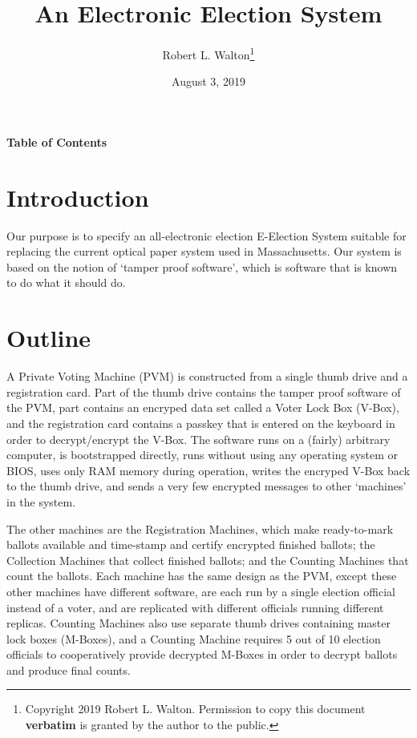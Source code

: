 \documentclass[12pt]{article}
\makeatletter
\renewcommand\tableofcontents{%
    \begin{list}{}%
	     {\setlength{\itemsep}{0in}%
	      \setlength{\topsep}{0in}%
	      \setlength{\parsep}{1ex}%
	      \setlength{\labelwidth}{0in}%
	      \setlength{\baselineskip}{1.5ex}%
	      \setlength{\leftmargin}{0.8in}%
	      \setlength{\rightmargin}{0.8in}}%
    \item\@starttoc{toc}%
    \end{list}}
\makeatother
\begin{document}
        
\title{An Electronic Election System}

\author{Robert L. Walton\thanks{Copyright 2019 Robert L. Walton.
Permission to copy this document {\bf verbatim} is granted by the author
to the public.}}

\date{August 3, 2019}

\maketitle

\begin{center}
\large \bf Table of Contents
\end{center}

\bigskip

\tableofcontents 

\newpage

\section{Introduction}

Our purpose is to specify an all-electronic election E-Election System
suitable for replacing the current optical paper system
used in Massachusetts.  Our system is based on the notion
of `tamper proof software', which is software that is
known to do what it should do.

\section{Outline}

A Private Voting Machine
(PVM) is constructed from a single thumb drive and a
registration card.  Part of the thumb drive contains the
tamper proof software of the PVM, part contains an encryped
data set called a Voter Lock Box (V-Box), and the registration
card contains a passkey that is entered on the keyboard in
order to decrypt/encrypt the V-Box.  The software runs on
a (fairly) arbitrary computer, is bootstrapped directly,
runs without using any operating system or BIOS,
uses only RAM memory during operation,
writes the encryped V-Box back to the thumb drive, and sends
a very few encrypted messages to other `machines' in the
system.

The other machines are the Registration Machines, which make
ready-to-mark ballots available and time-stamp and certify
encrypted finished ballots; the Collection Machines that collect
finished ballots; and the Counting Machines that count the
ballots.  Each machine has the same design as the PVM, except
these other machines have different software,
are each run by a single election official instead of a voter, and
are replicated with different officials running different
replicas.  Counting Machines also use separate
thumb drives containing master lock boxes
(M-Boxes), and a Counting Machine requires
5 out of 10 election officials to cooperatively
provide decrypted M-Boxes in order to decrypt ballots and
produce final counts.
\end{document}
